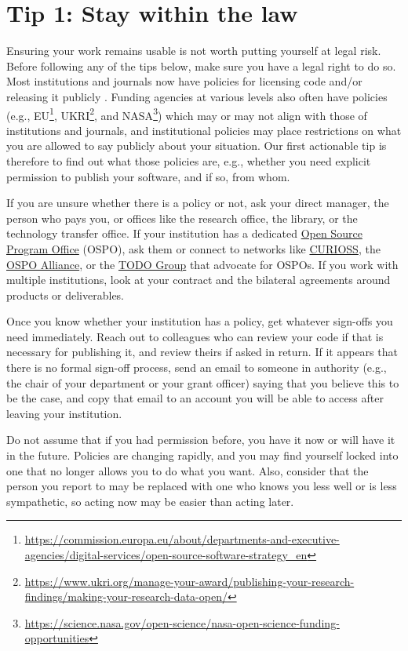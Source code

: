 \documentclass[10pt,letterpaper]{article}
\begin{document}
\section*{Tip 1: Stay within the law}

Ensuring your work remains usable is not worth putting yourself at legal risk.
Before following any of the tips below,
make sure you have a legal right to do so.
Most institutions and journals now have policies for licensing code and/or releasing it publicly \cite{Katz2018, Ham2019}.
Funding agencies at various levels also often have policies
(e.g.,
EU\footnote{\url{https://commission.europa.eu/about/departments-and-executive-agencies/digital-services/open-source-software-strategy_en}},
UKRI\footnote{\url{https://www.ukri.org/manage-your-award/publishing-your-research-findings/making-your-research-data-open/}},
and NASA\footnote{\url{https://science.nasa.gov/open-science/nasa-open-science-funding-opportunities}})
which may or may not align with those of institutions and journals, and institutional policies may place restrictions on what you are allowed to say publicly about your situation.
Our first actionable tip is therefore to find out what those policies are,
e.g., whether you need explicit permission to publish your software, and if so, from whom.

If you are unsure whether there is a policy or not, ask your direct manager, the person who pays you, or offices like the research office, the library, or the technology transfer office.
If your institution has a dedicated \href{https://sustainoss.org/academic-map/universities/index.html}{Open Source Program Office} (OSPO), ask them or connect to networks like \href{https://curioss.org}{CURIOSS}, the \href{https://ospo-alliance.org/}{OSPO Alliance}, or the \href{https://todogroup.org/}{TODO Group} that advocate for OSPOs.
If you work with multiple institutions, look at your contract and the bilateral agreements around products or deliverables.

Once you know whether your institution has a policy, get whatever sign-offs you need immediately.
Reach out to colleagues who can review your code if that is necessary for publishing it, and review theirs if asked in return.
If it appears that there is no formal sign-off process, send an email to someone in authority (e.g., the chair of your department or your grant officer) saying that you believe this to be the case, and copy that email to an account you will be able to access after leaving your institution.

Do not assume that if you had permission before, you have it now or will have it in the future.
Policies are changing rapidly, and you may find yourself locked into one that no longer allows you to do what you want.
Also, consider that the person you report to may be replaced with one who knows you less well or is less sympathetic,
so acting now may be easier than acting later.
\end{document}
